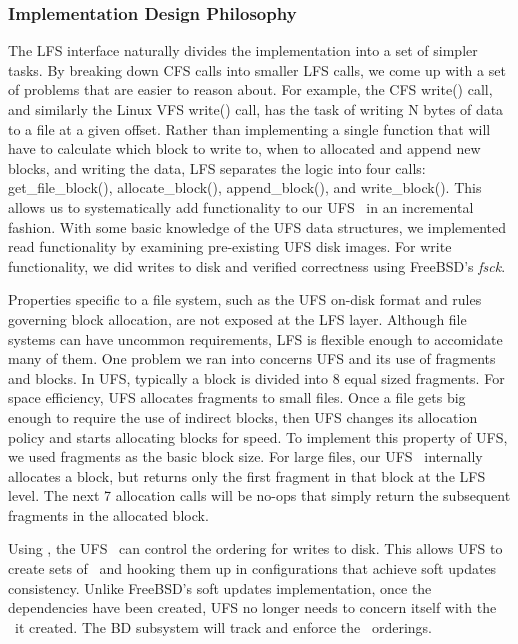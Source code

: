 \subsubsection {Implementation Design Philosophy}
The LFS interface naturally divides the implementation into a set of simpler
tasks. By breaking down CFS calls into smaller LFS calls, we come up with a
set of problems that are easier to reason about. For example, the CFS write()
call, and similarly the Linux VFS write() call, has the task of writing N
bytes of data to a file at a given offset. Rather than implementing a single
function that will have to calculate which block to write to, when to
allocated and append new blocks, and writing the data, LFS separates the
logic into four calls:
get\_file\_block(), allocate\_block(), append\_block(), and write\_block().
This allows us to systematically add functionality to our UFS \module\ in
an incremental fashion. With some basic knowledge of the UFS data structures,
we implemented read functionality by examining pre-existing UFS disk images.
For write functionality, we did writes to disk and verified correctness using
FreeBSD's \emph{fsck}.

Properties specific to a file system, such as the UFS on-disk format and rules
governing block allocation, are not exposed at the LFS layer. Although file
systems can have uncommon requirements, LFS is flexible enough to accomidate
many of them. One problem we ran into concerns UFS and its use of fragments
and blocks. In UFS, typically a block is divided into 8 equal sized fragments.
For space efficiency, UFS allocates fragments to small files. Once a file gets
big enough to require the use of indirect blocks, then UFS changes its
allocation policy and starts allocating blocks for speed. To implement this
property of UFS, we used fragments as the basic block size. For large files,
our UFS \module\ internally allocates a block, but returns only the first
fragment in that block at the LFS level. The next 7 allocation calls will be
no-ops that simply return the subsequent fragments in the allocated block.

Using \chdescs, the UFS \module\ can control the ordering for writes to disk.
This allows UFS to create sets of \chdescs\ and hooking them up in
configurations that achieve soft updates consistency. Unlike FreeBSD's soft
updates implementation, once the dependencies have been created, UFS no longer
needs to concern itself with the \chdescs\ it created. The BD subsystem will
track and enforce the \chdesc\ orderings.

